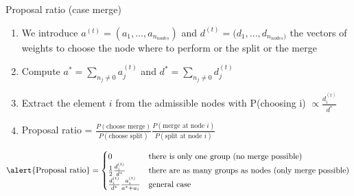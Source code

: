 \begin{frame}{Proposal ratio (case merge)}

\begin{enumerate}
\item We introduce $a^{(t)}=(a_{1}, ... , a_{n_{nodes}})$ and $d^{(t)}=(d_{1}, ... , d_{n_{nodes})}$ the vectors of \alert{weights} to choose the node where to perform or the split or the merge 

\item Compute $a^{*} = \sum_{n_{j}\neq 0}{a_{j}^{(t)}}$  and $d^{*} = \sum_{n_{j}\neq 0}{d_{j}^{(t)}}$

\item \alert{Extract the element $i$} from the admissible nodes with P(choosing i) $\varpropto \frac{d_{i}^{(t)}}{d^{*}}$

\item 
\alert{Proposal ratio} = $\frac{P(\text{choose merge})}{P(\text{choose split})} \frac{P(\text{merge at node $i$})}{P(\text{split at node $i$})}$



\end{enumerate}

\pause 

\[ 
\text{\alert{Proposal ratio}} =
    \begin{cases} 
         0 & \text{there is only one group (no merge possible)}  \\
         \frac{1}{2}\frac{d_{i}^{(t)}}{d^{*}} & \text{there are as many groups as nodes (only merge possible)} \\
         \frac{d_{i}^{(t)}}{d^{*}} \frac{a_{i}^{(t)}}{a^{*}+a_{i}} & \text{general case} \\
    \end{cases}
\]

\end{frame}




